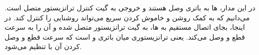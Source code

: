 \documentclass[12pt,a4paper]{article}
\begin{document}
در این مدار،  ها به باتری وصل هستند و خروجی  به گیت کنترل ترانزیستور  متصل است. می‌دانیم که  به کمک روشن و خاموش کردن سریع می‌تواند روشنایی را کنترل کند. در اینجا، بجای اتصال مستقیم  به  ها، به گیت ترانزیستور متصل شده و آن را به سرعت قطع و وصل می‌کند. یعنی ترانزیستوری میان باتری و  است که سرعت قطع و وصل کردن آن با  تنظیم می‌شود.
\begin{latin}
	
\end{latin}
\end{document}
